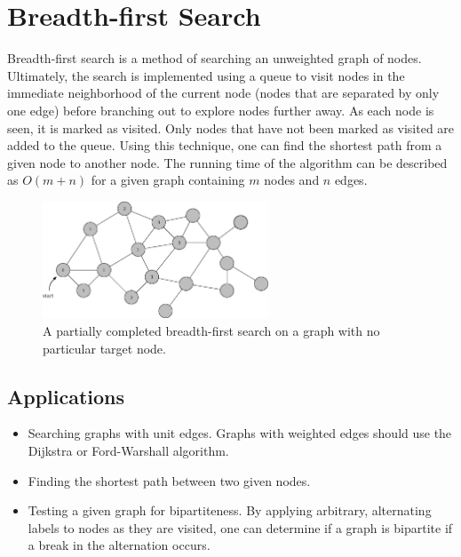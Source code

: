 \section{Breadth-first Search}

Breadth-first search is a method of searching an unweighted graph of nodes.
Ultimately, the search is implemented using a queue to visit nodes in the immediate neighborhood of the current node (nodes that are separated by only one edge) before branching out to explore nodes further away.
As each node is seen, it is marked as visited.
Only nodes that have not been marked as visited are added to the queue.
Using this technique, one can find the shortest path from a given node to another node.
The running time of the algorithm can be described as $O(m + n)$ for a given graph containing $m$ nodes and $n$ edges.

\begin{figure}[h]
	\centering
	\includegraphics[width=0.6\textwidth]{./algorithms/breadth-first-search/partial-bfs}
	\caption{\small A partially completed breadth-first search on a graph with no particular target node.}
\end{figure}

\subsection{Applications}

\begin{itemize}
	\item Searching graphs with unit edges.
		Graphs with weighted edges should use the Dijkstra or Ford-Warshall algorithm.
	\item Finding the shortest path between two given nodes.
	\item Testing a given graph for bipartiteness.
	By applying arbitrary, alternating labels to nodes as they are visited, one can determine if a graph is bipartite if a break in the alternation occurs.
\end{itemize}

